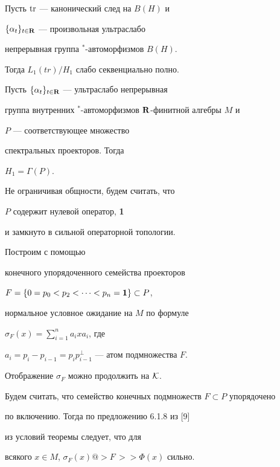 \begin{thm}


Пусть $\operatorname{tr}$ --- канонический след на $B(H)$ и


$\{\alpha_{t}\}_{t\in {\bold R}}$ --- произвольная ультраслабо 


непрерывная группа $^{*}$-автоморфизмов $B(H)$.


Тогда $L_{1}(tr)/H_{1}$ слабо секвенциально полно.


\end{thm}





\begin{lem}


Пусть $\{\alpha_{t}\}_{t\in {\bold R}}$ --- ультраслабо непрерывная 


группа внутренних $^{*}$-автоморфиз\-мов $\bold R$-финитной алгебры $M$ и


$P$ --- соответствующее множество


спектральных проекторов. Тогда


$H_{1}=\Gamma(P)$.


\end{lem}





Не ограничивая общности, будем считать, что


$P$ содержит нулевой оператор, {\bf 1}


и замкнуто в сильной операторной топологии.


Построим с помощью


конечного упорядоченного семейства проекторов


$F=\{ 0=p_{0}<p_{2}<\dotsb<p_{n}={\bold 1} \}\subset P$,


нормальное условное ожидание на $M$ по формуле


$\sigma_F(x)=\sum\limits_{i=1}^{n} a_{i}xa_{i}$, где


$a_{i}=p_{i}-p_{i-1}=p_{i}p_{i-1}^{\perp}$ --- атом подмножества $F$.


Отображение $\sigma_F$ можно продолжить на $\cal K$.


Будем считать, что семейство конечных подмножеств $F\subset P$ упорядочено


по включению. Тогда по предложению 6.1.8 из [9]


из условий теоремы следует, что для


всякого $x\in M$, $\sigma_F(x) @>{F\,}>> \Phi(x)$ сильно.


